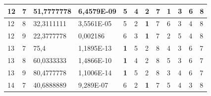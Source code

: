 \documentclass[conference]{IEEEtran}
\begin{document}
\begin{table}[]
\begin{tabular}{|llll|llllllll|}
		\multicolumn{1}{|l|}{12}  & \multicolumn{1}{l|}{7}         & \multicolumn{1}{l|}{51,7777778}    & 6,4579E-09 & \multicolumn{1}{l|}{5}          & \multicolumn{1}{l|}{4}          & \multicolumn{1}{l|}{2}          & \multicolumn{1}{l|}{7}   & \multicolumn{1}{l|}{\textbf{1}} & \multicolumn{1}{l|}{3}          & \multicolumn{1}{l|}{6}   & 8                      \\ \hline
		\multicolumn{1}{|l|}{12}  & \multicolumn{1}{l|}{8}         & \multicolumn{1}{l|}{32,3111111}    & 3,5561E-05 & \multicolumn{1}{l|}{5}          & \multicolumn{1}{l|}{2}          & \multicolumn{1}{l|}{\textbf{1}} & \multicolumn{1}{l|}{7}   & \multicolumn{1}{l|}{6}          & \multicolumn{1}{l|}{3}          & \multicolumn{1}{l|}{4}   & 8                      \\ \hline
		\multicolumn{1}{|l|}{12}  & \multicolumn{1}{l|}{9}         & \multicolumn{1}{l|}{22,3777778}    & 0,002186   & \multicolumn{1}{l|}{6}          & \multicolumn{1}{l|}{3}          & \multicolumn{1}{l|}{\textbf{1}} & \multicolumn{1}{l|}{7}   & \multicolumn{1}{l|}{2}          & \multicolumn{1}{l|}{5}          & \multicolumn{1}{l|}{4}   & 8                      \\ \hline
		\multicolumn{1}{|l|}{13}  & \multicolumn{1}{l|}{7}         & \multicolumn{1}{l|}{75,4}          & 1,1895E-13 & \multicolumn{1}{l|}{\textbf{1}} & \multicolumn{1}{l|}{5}          & \multicolumn{1}{l|}{2}          & \multicolumn{1}{l|}{8}   & \multicolumn{1}{l|}{4}          & \multicolumn{1}{l|}{3}          & \multicolumn{1}{l|}{6}   & 7                      \\ \hline
		\multicolumn{1}{|l|}{13}  & \multicolumn{1}{l|}{8}         & \multicolumn{1}{l|}{60,0333333}    & 1,4866E-10 & \multicolumn{1}{l|}{\textbf{1}} & \multicolumn{1}{l|}{4}          & \multicolumn{1}{l|}{2}          & \multicolumn{1}{l|}{8}   & \multicolumn{1}{l|}{5}          & \multicolumn{1}{l|}{3}          & \multicolumn{1}{l|}{6}   & 7                      \\ \hline
		\multicolumn{1}{|l|}{13}  & \multicolumn{1}{l|}{9}         & \multicolumn{1}{l|}{80,4777778}    & 1,1006E-14 & \multicolumn{1}{l|}{\textbf{1}} & \multicolumn{1}{l|}{5}          & \multicolumn{1}{l|}{2}          & \multicolumn{1}{l|}{8}   & \multicolumn{1}{l|}{3}          & \multicolumn{1}{l|}{4}          & \multicolumn{1}{l|}{6}   & 7                      \\ \hline
		\multicolumn{1}{|l|}{14}  & \multicolumn{1}{l|}{7}         & \multicolumn{1}{l|}{40,6888889}    & 9,289E-07  & \multicolumn{1}{l|}{6}          & \multicolumn{1}{l|}{2}          & \multicolumn{1}{l|}{\textbf{1}} & \multicolumn{1}{l|}{7}   & \multicolumn{1}{l|}{5}          & \multicolumn{1}{l|}{4}          & \multicolumn{1}{l|}{3}   & 8                      \\ \hline

\end{tabular}
\end{table}
\end{document}
